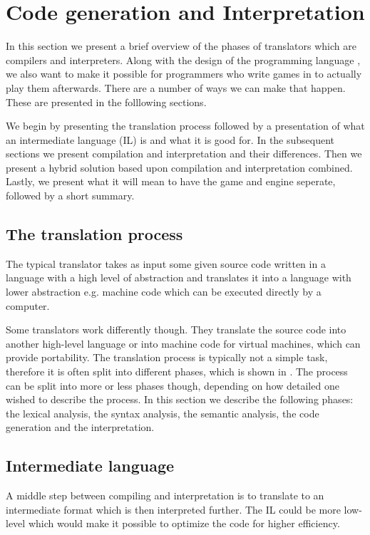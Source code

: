 \section{Code generation and Interpretation}
\label{sec:codegenerationandinterpretation}

In this section we present a brief overview of the phases of translators
which are compilers and interpreters. Along with the design of the programming
language \productname{}, we also want to make it possible for programmers who
write games in \productname{} to actually play them afterwards. There are a
number of ways we can make that happen. These are presented in the folllowing
sections. 

We begin by presenting the translation process followed by a presentation of
what an intermediate language (IL) is and what it is good for. In the subsequent
sections we present compilation and interpretation and their differences. Then
we present a hybrid solution based upon compilation and interpretation combined.
Lastly, we present what it will mean to have the game and engine seperate,
followed by a short summary.

\subsection{The translation process}
The typical translator takes as input some given source code written in a
language with a high level of abstraction and translates it into a language with
lower abstraction e.g. machine code which can be executed directly by a
computer.
\cite[p. 44]{sebesta2013} 

Some translators work differently though. They translate the source code into
another high-level language or into machine code for virtual machines, which can
provide portability. The translation process is typically not a simple task,
therefore it is often split into different phases, which is shown in
. The process can be split into more or less phases
though, depending on how detailed one wished to describe the process. In this
section we describe the following phases: the lexical analysis, the syntax
analysis, the semantic analysis, the code generation and the interpretation.



\subsection{Intermediate language}
A middle step between compiling and interpretation is to translate to an
intermediate format which is then interpreted further. The IL could be more
low-level which would make it possible to optimize the code for higher
efficiency.

